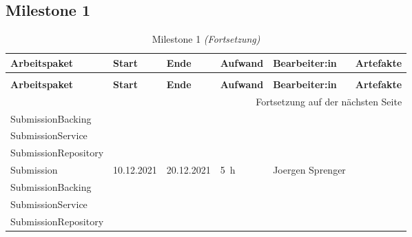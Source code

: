 \newcommand{\atable}[3]{\begin{longtable}{llllll}
                            \caption{#2}\label{tab:#1} \\
                            \toprule
                            \textbf{Arbeitspaket} & \textbf{Start} & \textbf{Ende} & \textbf{Aufwand} & \textbf{Bearbeiter:in} & \textbf{Artefakte}
                            \\
                            \midrule
                            \endfirsthead

                            \caption{#2 \emph{(Fortsetzung)}}\\
                            \toprule
                            \textbf{Arbeitspaket} & \textbf{Start} & \textbf{Ende} & \textbf{Aufwand} & \textbf{Bearbeiter:in} & \textbf{Artefakte}
                            \\
                            \midrule
                            \endhead

                            \multicolumn{6}{r}{{Fortsetzung auf der nächsten Seite}}
                            \endfoot

                            \bottomrule
                            \endlastfoot

                            #3
\end{longtable}
}

\newcommand{\aentry}[6]{\footnotesize#1 & \footnotesize#2 & \footnotesize#3 & \footnotesize#4 & \footnotesize#5 & \footnotesize\makecell{#6}\\\midrule}

\renewcommand{\cellalign}{cl}


\subsection{Milestone 1}
\atable{milestone1}{Milestone 1}{
    \aentry{Submission}{10.12.2021}{20.12.2021}{5~h}{Joergen Sprenger}{submission.xhtml\\SubmissionBacking\\SubmissionService\\SubmissionRepository}
    \aentry{Submission}{10.12.2021}{20.12.2021}{5~h}{Joergen Sprenger}{submission.xhtml\\SubmissionBacking\\SubmissionService\\SubmissionRepository}
}

